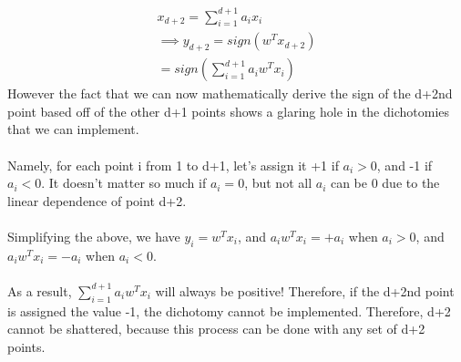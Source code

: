 \documentclass[12pt]{article}
\begin{document}
\begin{enumerate}[label=(\alph*)]
	\begin{gather*}
		x_{d+2} = \sum^{d+1}_{i = 1}a_ix_i
		\\ \implies y_{d+2} = sign(w^Tx_{d+2}) 
		\\ = sign(\sum^{d+1}_{i = 1}a_iw^Tx_i)
	\end{gather*}
	However the fact that we can now mathematically derive the sign of the d+2nd point based off of the other d+1 points shows a glaring hole in the dichotomies that we can implement.
	\\ \\ Namely, for each point i from 1 to d+1, let's assign it +1 if $a_i > 0$, and -1 if $a_i < 0$. It doesn't matter so much if $a_i = 0$, but not all $a_i$ can be 0 due to the linear dependence of point d+2.
	\\ \\ Simplifying the above, we have $y_i = w^Tx_i$, and $a_iw^Tx_i = +a_i$ when $a_i > 0$, and $a_iw^Tx_i = -a_i$ when $a_i < 0$.
	\\ \\ As a result, $\sum^{d+1}_{i = 1}a_iw^Tx_i$ will always be positive! Therefore, if the d+2nd point is assigned the value -1, the dichotomy cannot be implemented. Therefore, d+2 cannot be shattered, because this process can be done with any set of d+2 points.
\end{enumerate}
\end{document}
